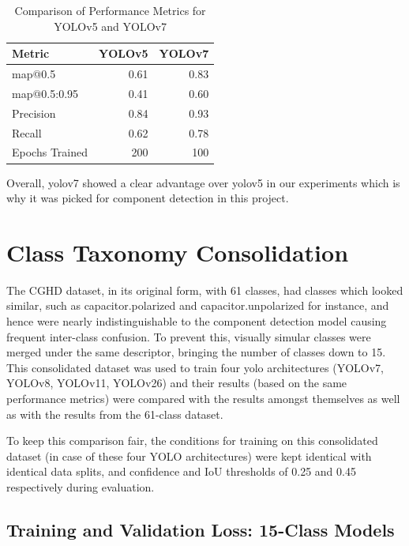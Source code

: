 \begin{table}[H]
    \centering
    \caption{Comparison of Performance Metrics for YOLOv5 and YOLOv7}
    \label{table:yolo-comparison}
    \begin{tabular}{lrr}
        \toprule
        \textbf{Metric} & \textbf{YOLOv5} & \textbf{YOLOv7} \\
        \midrule
        \gls{map}@0.5 & 0.61 & 0.83 \\
        \gls{map}@0.5:0.95 & 0.41 & 0.60 \\
        Precision & 0.84 & 0.93 \\
        Recall & 0.62 & 0.78 \\
        Epochs Trained & 200 & 100 \\
        \bottomrule
    \end{tabular}
\end{table}

Overall, \gls{yolo}v7 showed a clear advantage over \gls{yolo}v5 in our experiments which is why it was picked for component detection in this project.

\section{Class Taxonomy Consolidation}

The CGHD dataset, in its original form, with 61 classes, had classes which looked similar, such as capacitor.polarized and capacitor.unpolarized for instance, and hence were nearly indistinguishable to the component detection model causing frequent inter-class confusion. To prevent this, visually simular classes were merged under the same descriptor, bringing the number of classes down to 15. This consolidated dataset was used to train four \gls{yolo} architectures (YOLOv7, YOLOv8, YOLOv11, YOLOv26) and their results (based on the same performance metrics) were compared with the results amongst themselves as well as with the results from the 61-class dataset.

To keep this comparison fair, the conditions for training on this consolidated dataset (in case of these four YOLO architectures) were kept identical with identical data splits, and confidence and IoU thresholds of 0.25 and 0.45 respectively during evaluation.

\subsection{Training and Validation Loss: 15-Class Models}

